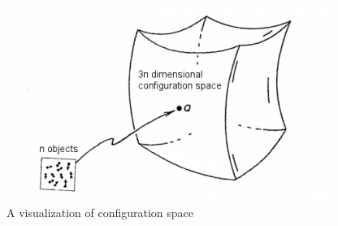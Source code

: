 \begin{figure}[H]
    \centering
    \includegraphics[scale=0.5]{Figures/configspace.png}
    \caption{A visualization of configuration space}
    \label{fig:my_label}
\end{figure}
